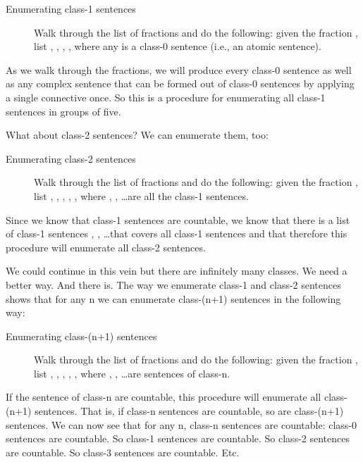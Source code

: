 \begin{description}
 \item[Enumerating class-1 sentences]
Walk through  the list of fractions and do the following: given the fraction 
, list , , , , 
 where any  is a class-0 sentence (i.e., an atomic 
sentence).
\end{description}

As we walk through the fractions, we will produce every class-0 sentence as well 
as any complex sentence that can be formed out of class-0 sentences by applying 
a single connective once. So this is a procedure for enumerating all class-1 
sentences in groups of five.

What about class-2 sentences? We can enumerate them, too:

\begin{description}
 \item[Enumerating class-2 sentences]
Walk through  the list of fractions and do the following: given the fraction 
, list , , , , 
, where , , \ldots are all the class-1 
sentences.
\end{description}

Since we know that class-1 sentences are countable, we know that there is a 
list of class-1 sentences , , \ldots that covers all class-1 
sentences and that therefore this procedure will enumerate all class-2 
sentences.  

We could continue in this vein but there are infinitely many classes. We need a 
better way. And there is. The way we enumerate class-1 and class-2 sentences 
shows that for any n we can enumerate class-(n+1) sentences in the following way:

\begin{description}
 \item[Enumerating class-(n+1) sentences]
Walk through  the list of fractions and do the following: given the fraction 
, list , , , , 
, where , , \ldots are sentences of class-n.
\end{description}

If the sentence of class-n are countable, this procedure will enumerate all 
class-(n+1) sentences. That is, if class-n sentences are countable, so are 
class-(n+1) sentences. We can now see that for any n, class-n sentences are 
countable: class-0 sentences are countable. So class-1 sentences are countable.  
So class-2 sentences are countable. So class-3 sentences are countable. Etc. 


